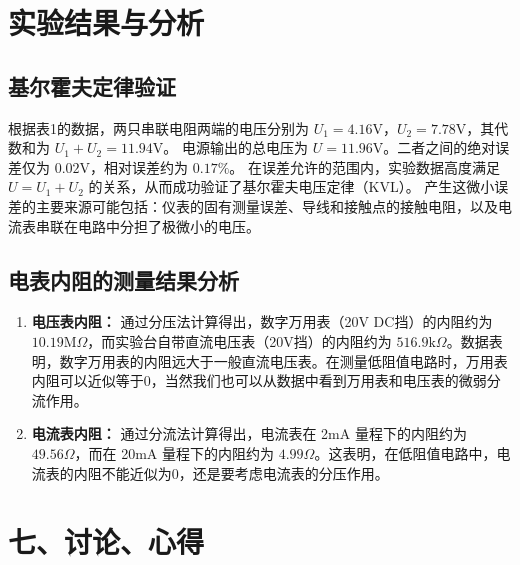 \documentclass[10.5pt]{config}
\begin{document}
\section{实验结果与分析}
\subsection{基尔霍夫定律验证}
根据表1的数据，两只串联电阻两端的电压分别为 $U_1 = 4.16\mathrm{V}$，$U_2 = 7.78\mathrm{V}$，其代数和为 $U_1 + U_2 = 11.94\mathrm{V}$。
电源输出的总电压为 $U = 11.96\mathrm{V}$。二者之间的绝对误差仅为 $0.02\mathrm{V}$，相对误差约为 $0.17\%$。
在误差允许的范围内，实验数据高度满足 $U = U_1 + U_2$ 的关系，从而成功验证了基尔霍夫电压定律（KVL）。
产生这微小误差的主要来源可能包括：仪表的固有测量误差、导线和接触点的接触电阻，以及电流表串联在电路中分担了极微小的电压。

\subsection{电表内阻的测量结果分析}
\begin{enumerate}
    \item \textbf{电压表内阻：} 通过分压法计算得出，数字万用表（20V DC挡）的内阻约为 $10.19\mathrm{M}\Omega$，而实验台自带直流电压表（20V挡）的内阻约为 $516.9\mathrm{k}\Omega$。数据表明，数字万用表的内阻远大于一般直流电压表。在测量低阻值电路时，万用表内阻可以近似等于0，当然我们也可以从数据中看到万用表和电压表的微弱分流作用。
    \item \textbf{电流表内阻：} 通过分流法计算得出，电流表在 2mA 量程下的内阻约为 $49.56\Omega$，而在 20mA 量程下的内阻约为 $4.99\Omega$。这表明，在低阻值电路中，电流表的内阻不能近似为0，还是要考虑电流表的分压作用。
\end{enumerate}

\section*{七、讨论、心得}
\end{document}
